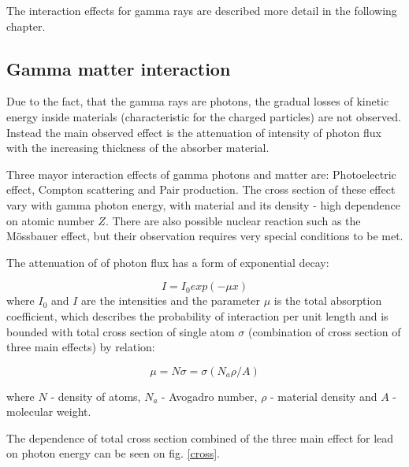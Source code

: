 \par

The interaction effects for gamma rays are described more detail in the following chapter.



\subsection{Gamma matter interaction}

Due to the fact, that the gamma rays are photons, the gradual losses of kinetic energy inside materials (characteristic for the charged particles) are not observed. Instead the main observed effect is the attenuation of intensity of photon flux with the increasing thickness of the absorber material. 

\par
Three mayor interaction effects of gamma photons and matter are: Photoelectric effect, Compton scattering and Pair production. The cross section of these effect vary with gamma photon energy, with material and its density - high dependence on atomic number $Z$. There are also possible nuclear reaction such as the Mössbauer effect, but their observation requires very special conditions to be met.


\par
The attenuation of of photon flux has a form of exponential decay:

\begin{equation}
 I = I_{0}exp(-\mu x)
 \end{equation}
where $I_{0}$ and $I$ are the intensities and the parameter $\mu$ is the total absorption coefficient, which describes the probability of interaction per unit length and is bounded with total cross section of single atom $\sigma$ (combination of cross section of three main effects) by relation:

\begin{equation}
 \mu = N \sigma = \sigma(N_{a}\rho/A)
 \end{equation}
 
where $N$ - density of atoms, $N_{a}$ - Avogadro number, $\rho$ - material density and $A$ - molecular weight.

\par
The dependence of total cross section combined of the three main effect for lead on photon energy can be seen on fig. \ref{cross}.

